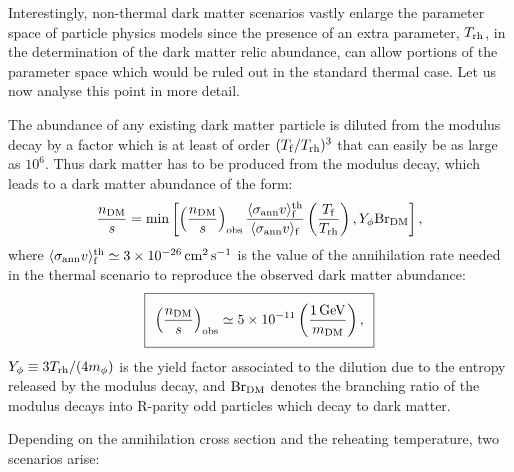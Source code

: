 Interestingly, non-thermal dark matter scenarios vastly enlarge the parameter space of particle physics models since the presence of an extra parameter, $T_{\rm rh}$, in the determination of the dark matter relic abundance, can allow portions of the parameter space which would be ruled out in the standard thermal case. Let us now analyse this point in more detail.

The abundance of any existing dark matter particle is diluted from the modulus decay by a factor which is at least of order $(T_{\rm f}/T_{\rm rh})^3$ that can easily be as large as $10^6$. Thus dark matter has to be produced from the modulus decay, which leads to a dark matter abundance of the form:
\begin{equation}
\frac{n_{\rm DM}}{s} = {\rm min}\left[\left(\frac{n_{\rm DM}}{s}\right)_{\rm obs}\frac{\langle\sigma_{\rm ann}v\rangle^{\rm th}_{\rm f}}{\langle\sigma_{\rm ann}v\rangle_{\rm f}}\left(\frac{T_{\rm f}}{T_{\rm rh}}\right),Y_\phi {\rm Br}_{\rm DM}\right],
\label{NonThDM}
\end{equation}
where $\langle\sigma_{\rm ann}v\rangle^{\rm th}_{\rm f}\simeq 3\times 10^{-26}\,{\rm cm}^2\,{\rm s}^{-1}$ is the value of the annihilation rate needed in the thermal scenario to reproduce the observed dark matter abundance:
\begin{equation}
\setlength\fboxsep{0.25cm}
\setlength\fboxrule{0.4pt}
\boxed{
\left(\frac{n_{\rm DM}}{s}\right)_{\rm obs} \simeq 5\times 10^{-11}\left(\frac{1\,{\rm GeV}}{m_{\rm DM}}\right),
}
\end{equation}
$Y_\phi \equiv 3 T_{\rm rh}/( 4 m_\phi)$ is the yield factor associated to the dilution due to the entropy released by the modulus decay, and ${\rm Br}_{\rm DM}$ denotes the branching ratio of the modulus decays into R-parity odd particles which decay to dark matter.

Depending on the annihilation cross section and the reheating temperature, two scenarios arise:

